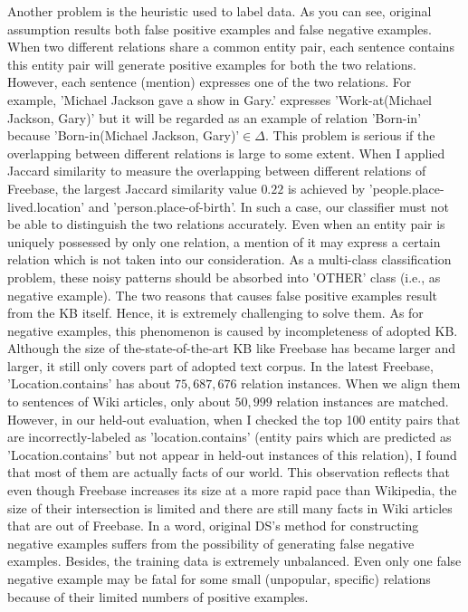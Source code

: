 \documentclass[10pt]{article} %
\theoremstyle{definition}
\theoremstyle{definition}
\begin{document}
Another problem is the heuristic used to label data. 
As you can see, original assumption results both false positive examples and false negative examples. 
When two different relations share a common entity pair, each sentence contains this entity pair will generate positive examples for both the two relations. 
However, each sentence (mention) expresses one of the two relations. 
For example, 'Michael Jackson gave a show in Gary.' expresses 'Work-at(Michael Jackson, Gary)' but it will be regarded as an example of relation 'Born-in' because 'Born-in(Michael Jackson, Gary)'$\in\Delta$. 
This problem is serious if the overlapping between different relations is large to some extent. 
When I applied Jaccard similarity to measure the overlapping between different relations of Freebase, 
the largest Jaccard similarity value $0.22$ is achieved by 'people.place-lived.location' and 'person.place-of-birth'. 
In such a case, our classifier must not be able to distinguish the two relations accurately. 
Even when an entity pair is uniquely possessed by only one relation, a mention of it may express a certain relation which is not taken into our consideration. 
As a multi-class classification problem, these noisy patterns should be absorbed into 'OTHER' class (i.e., as negative example). 
The two reasons that causes false positive examples result from the KB itself.
Hence, it is extremely challenging to solve them. 
As for negative examples, this phenomenon is caused by incompleteness of adopted KB. 
Although the size of the-state-of-the-art KB like Freebase has became larger and larger, it still only covers part of adopted text corpus. 
In the latest Freebase, 'Location.contains' has about $75,687,676$ relation instances. 
When we align them to sentences of Wiki articles, only about $50,999$ relation instances are matched. 
However, in our held-out evaluation, when I checked the top 100 entity pairs that are incorrectly-labeled as 'location.contains' 
(entity pairs which are predicted as 'Location.contains' but not appear in held-out instances of this relation), 
I found that most of them are actually facts of our world. 
This observation reflects that even though Freebase increases its size at a more rapid pace than Wikipedia, 
the size of their intersection is limited and there are still many facts in Wiki articles that are out of Freebase. 
In a word, original DS's method for constructing negative examples suffers from the possibility of generating false negative examples. 
Besides, the training data is extremely unbalanced. 
Even only one false negative example may be fatal for some small (unpopular, specific) relations because of their limited numbers of positive examples. 
\end{document}
